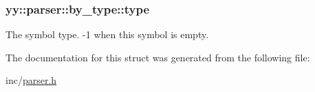 \subsubsection[{type}]{ yy\+::parser\+::by\+\_\+type\+::type}\label{structyy_1_1parser_1_1by__type_aecfb7b8174ce27df6dc0e6ef919bfb48}
The symbol type. -\/1 when this symbol is empty. 

The documentation for this struct was generated from the following file\+:\begin{DoxyCompactItemize}
\item 
inc/\hyperlink{parser_8h}{parser.\+h}\end{DoxyCompactItemize}
